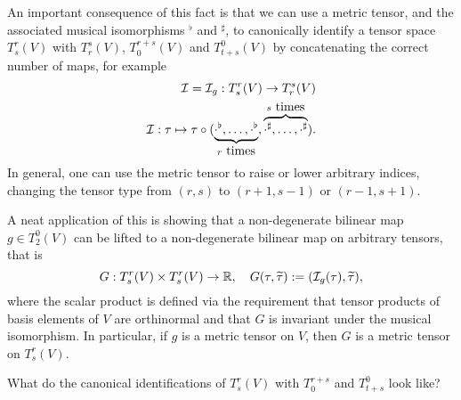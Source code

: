 \begin{remark}
  An important consequence of this fact is that we can use a metric tensor, and the associated musical isomorphisms ${}^\flat$ and ${}^\sharp$, to canonically identify a tensor space $T_s^r(V)$ with $T_r^s(V)$, $T_0^{r+s}(V)$ and $T_{t+s}^0(V)$ by concatenating the correct number of maps, for example
  \begin{align}
    \cI = \cI_g : T_s^r (V) \to T_r^s(V) \\
    \cI : \tau \mapsto \tau \circ (\LaTeXunderbrace{{\cdot}^\flat, \ldots, {\cdot}^\flat}_{r\mbox{ times}}, \LaTeXoverbrace{{\cdot}^\sharp, \ldots, {\cdot}^\sharp}^{s\mbox{ times}}).
  \end{align}
  In general, one can use the metric tensor to raise or lower arbitrary indices, changing the tensor type from $(r,s)$ to $(r+1, s-1)$ or $(r-1, s+1)$.

  A neat application of this is showing that a non-degenerate bilinear map $g\in T_2^0(V)$ can be lifted to a non-degenerate bilinear map on arbitrary tensors, that is
  \begin{equation}
    G: T_s^r(V)\times T_s^r(V) \to \mathbb{R},
    \quad
    G(\tau, \widetilde\tau) := (\mathcal{I}_g(\tau), \widetilde\tau),
  \end{equation}
  where the scalar product is defined via the requirement that tensor products of basis elements of $V$ are orthinormal and that $G$ is invariant under the musical isomorphism.
  In particular, if $g$ is a metric tensor on $V$, then $G$ is a metric tensor on $T_s^r(V)$.

\end{remark}

\begin{exercise}
  What do the canonical identifications of $T_s^r(V)$ with $T_0^{r+s}$ and $T_{t+s}^0$ look like?
\end{exercise}

